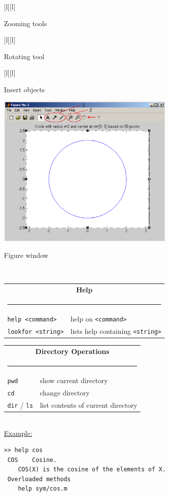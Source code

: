 \begin{Figure}[h]
  \centering
  [l][l]{\parbox{6cm}{\footnotesize\color{red} Zooming tools}}
  [l][l]{\parbox{5cm}{\footnotesize\color{red} Rotating tool}}
  [l][l]{\parbox{6cm}{\footnotesize\color{red} Insert objects}}
  \includegraphics[width=0.65\textwidth]{sec5_matlab/matlab_fig.eps}
  \caption{Figure window} 
\end{Figure}

\clearpage
{}
$\phantom{x}$

\begin{tabular}{ll}
\multicolumn{2}{c}{\bf Help}\\
\multicolumn{2}{c}{\rule{0.97\textwidth}{0pt}}\\[-2ex]\hline
\verb(help <command>( & help on \verb(<command>(\\
\verb(lookfor <string>( & lists help containing \verb(<string>(\\
\hline
\end{tabular}

\begin{tabular}{ll}
\multicolumn{2}{c}{\bf Directory Operations}\\
\multicolumn{2}{c}{\rule{0.97\textwidth}{0pt}}\\[-2ex]\hline
\verb(pwd( & show current directory\\
\verb(cd( & change directory\\
\verb(dir( / \verb(ls( & list contents of current directory\\
\hline
\end{tabular}\\

\underline{Example:}\\[-5ex]
{\small\begin{verbatim}
>> help cos
 COS    Cosine.
    COS(X) is the cosine of the elements of X. 
 Overloaded methods
    help sym/cos.m
\end{verbatim}}

